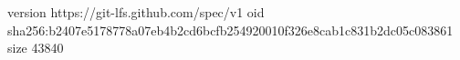 version https://git-lfs.github.com/spec/v1
oid sha256:b2407e5178778a07eb4b2cd6bcfb254920010f326e8cab1c831b2dc05c083861
size 43840

